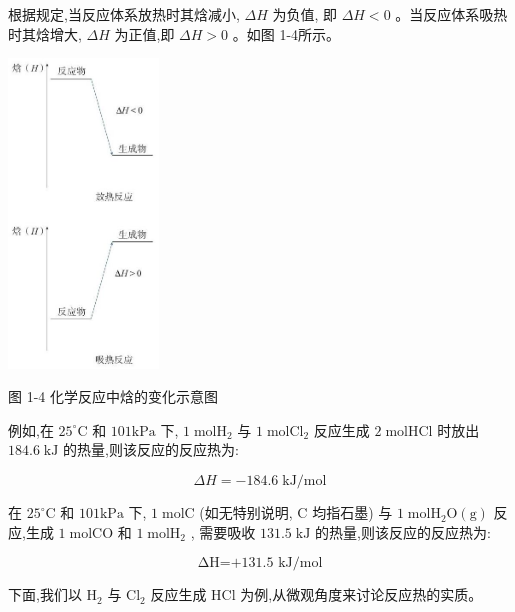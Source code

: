 \documentclass[10pt]{article}
\begin{document}

根据规定,当反应体系放热时其焓减小, \({\Delta H}\) 为负值, 即 \({\Delta H} < 0\) 。当反应体系吸热时其焓增大, \({\Delta H}\) 为正值,即 \({\Delta H} > 0\) 。如图 1-4所示。

\begin{center}
\includegraphics[max width=0.3\textwidth]{images/0190da9d-8bfd-732f-bc2c-0b21d0f13b91_12_406417.jpg}
\end{center}

图 1-4 化学反应中焓的变化示意图

例如,在 \({25}^{ \circ }\mathrm{C}\) 和 \({101}\mathrm{{kPa}}\) 下, \(1\mathrm{\;{mol}}{\mathrm{H}}_{2}\) 与 \(1\mathrm{\;{mol}}{\mathrm{{Cl}}}_{2}\) 反应生成 \(2\mathrm{\;{mol}}\mathrm{{HCl}}\) 时放出 \({184.6}\mathrm{\;{kJ}}\) 的热量,则该反应的反应热为:

\[
{\Delta H} = - {184.6}\mathrm{\;{kJ}}/\mathrm{{mol}}
\]

在 \({25}^{ \circ }\mathrm{C}\) 和 \({101}\mathrm{{kPa}}\) 下, \(1\mathrm{\;{mol}}\mathrm{C}\) (如无特别说明, \(\mathrm{C}\) 均指石墨) 与 \(1\mathrm{\;{mol}}{\mathrm{H}}_{2}\mathrm{O}\left( \mathrm{g}\right)\) 反应,生成 \(1\mathrm{\;{mol}}\mathrm{{CO}}\) 和 \(1\mathrm{\;{mol}}{\mathrm{H}}_{2}\) , 需要吸收 \({131.5}\mathrm{\;{kJ}}\) 的热量,则该反应的反应热为:

\[
\text{ΔH=+131.5 kJ/mol}
\]

下面,我们以 \({\mathrm{H}}_{2}\) 与 \({\mathrm{{Cl}}}_{2}\) 反应生成 \(\mathrm{{HCl}}\) 为例,从微观角度来讨论反应热的实质。
\end{document}
